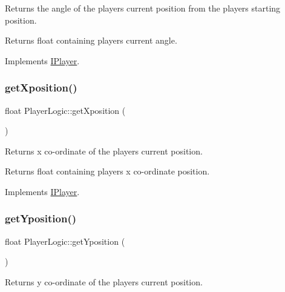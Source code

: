 Returns the angle of the player\textquotesingle{}s current position from the players starting position. 

\begin{DoxyReturn}{Returns}
float containing players current angle. 
\end{DoxyReturn}


Implements \hyperlink{class_i_player}{I\+Player}.

\mbox{\label{class_player_logic_a9f92defe2d43690329bd6e334fb61e01}} 
\subsubsection{\texorpdfstring{get\+Xposition()}{getXposition()}}
{\footnotesize\ttfamily float Player\+Logic\+::get\+Xposition (\begin{DoxyParamCaption}{ }\end{DoxyParamCaption})\hspace{0.3cm}{\ttfamily [virtual]}}



Returns x co-\/ordinate of the player\textquotesingle{}s current position. 

\begin{DoxyReturn}{Returns}
float containing players x co-\/ordinate position. 
\end{DoxyReturn}


Implements \hyperlink{class_i_player}{I\+Player}.

\mbox{\label{class_player_logic_a58d683bde5ee078f3b21897f2a5f4677}} 
\subsubsection{\texorpdfstring{get\+Yposition()}{getYposition()}}
{\footnotesize\ttfamily float Player\+Logic\+::get\+Yposition (\begin{DoxyParamCaption}{ }\end{DoxyParamCaption})\hspace{0.3cm}{\ttfamily [virtual]}}



Returns y co-\/ordinate of the player\textquotesingle{}s current position. 

